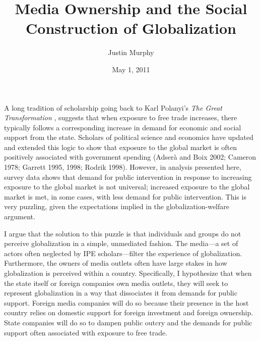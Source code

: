 \documentclass[12pt]{article}
\begin{document}
\title{Media Ownership and the Social Construction of Globalization}
\author{Justin Murphy}
\date{May 1, 2011}


\maketitle

A long tradition of scholarship going back to Karl Polanyi's \emph{The Great Transformation} \citep{Polanyi:2001vc}, suggests that when exposure to free trade increases, there typically follows a corresponding increase in demand for economic and social support from the state. Scholars of political science and economics have updated and extended this logic to show that exposure to the global market is often positively associated with government spending \citep{Adsera:2002vt} (Adserà and Boix 2002; Cameron 1978; Garrett 1995, 1998; Rodrik 1998). However, in analysis presented here, survey data shows that demand for public intervention in response to increasing exposure to the global market is not universal; increased exposure to the global market is met, in some cases, with less demand for public intervention. This is very puzzling, given the expectations implied in the globalization-welfare argument.

	I argue that the solution to this puzzle is that individuals and groups do not perceive globalization in a simple, unmediated fashion. The media---a set of actors often neglected by IPE scholars---filter the experience of globalization. Furthermore, the owners of media outlets often have large stakes in how globalization is perceived within a country. Specifically, I hypothesize that when the state itself or foreign companies own media outlets, they will seek to represent globalization in a way that dissociates it from demands for public support. Foreign media companies will do so because their presence in the host country relies on domestic support for foreign investment and foreign ownership. State companies will do so to dampen public outcry and the demands for public support often associated with exposure to free trade.
\end{document}
